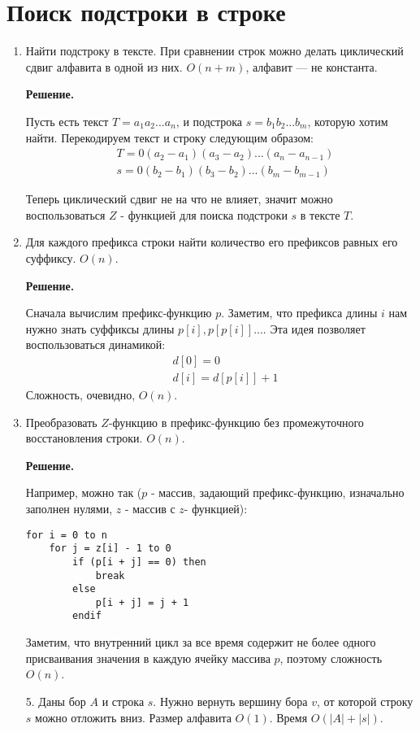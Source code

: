 \section{Поиск подстроки в строке}
\begin{enumerate}
	\item Найти подстроку в тексте. При сравнении строк можно делать циклический сдвиг алфавита в одной из них. 
	$O(n + m)$, алфавит — не константа.
	
	\textbf{Решение.}
	
	Пусть есть текст $T = a_1a_2...a_n$, и подстрока $s = b_1b_2...b_m$, которую хотим найти. Перекодируем текст и 
	строку следующим образом:
	\begin{align*}
		& T = 0(a_2 - a_1)(a_3 - a_2)...(a_n - a_{n - 1}) \\
		& s = 0(b_2 - b_1)(b_3 - b_2)...(b_m - b_{m - 1})
	\end{align*}
	
	Теперь циклический сдвиг не на что не влияет, значит можно воспользоваться $Z$ - функцией для поиска подстроки 
	$s$ в тексте $T$.
	
	\item Для каждого префикса строки найти количество его префиксов равных его суффиксу. $O(n)$.
	
	\textbf{Решение.}
	
	Сначала вычислим префикс-функцию $p$. Заметим, что префикса длины $i$ нам нужно знать суффиксы длины $p[i], 
	p[p[i]]...$. Эта идея позволяет воспользоваться динамикой:
	\begin{align*}
		& d[0] = 0 \\
		& d[i] = d[p[i]] + 1
	\end{align*}
	Сложность, очевидно, $O(n)$.
	
	\item Преобразовать $Z$-функцию в префикс-функцию без промежуточного восстановления строки. $O(n)$.
	
	\textbf{Решение.}
	
	Например, можно так ($p$ - массив, задающий префикс-функцию, изначально заполнен нулями, $z$ - массив с $z$- 
	функцией):
	\begin{lstlisting}
for i = 0 to n
	for j = z[i] - 1 to 0
		if (p[i + j] == 0) then
			break
		else
			p[i + j] = j + 1
		endif
	\end{lstlisting}
	
	Заметим, что внутренний цикл за все время содержит не более одного присваивания значения в каждую ячейку 
	массива $p$, поэтому сложность $O(n)$. 
	\item[5.] Даны бор $A$ и строка $s$. Нужно вернуть вершину бора $v$, от которой строку $s$ можно отложить вниз. 
	Размер алфавита $O(1)$. Время $O(|A| + |s|)$.
	

\end{enumerate}
